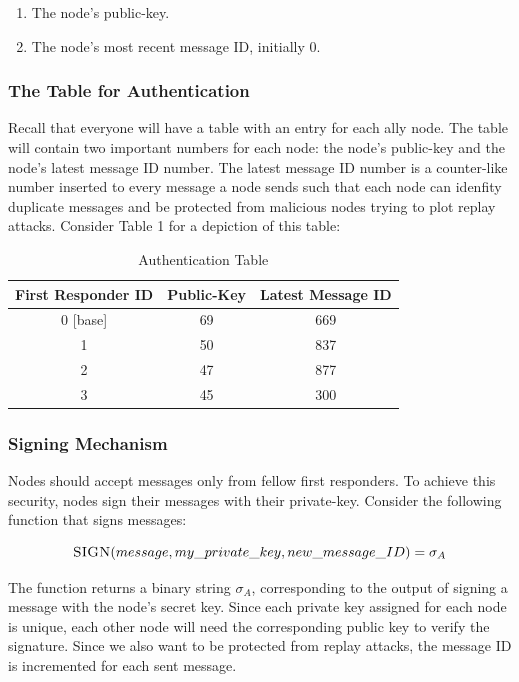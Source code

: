 \documentclass[letterpaper]{article}
\begin{document}
\begin{enumerate}
  \item The node's public-key. 
  \item The node's most recent message ID, initially 0.
\end{enumerate}

\subsubsection{The Table for Authentication}
Recall that everyone will have a table with an entry for each ally node. The table will contain two important numbers for each node: the node's public-key and the node's latest message ID number. The latest message ID number is a counter-like number inserted to every message a node sends such that each node can idenfity duplicate messages and be protected from malicious nodes trying to plot replay attacks. Consider Table 1 for a depiction of this table:

\begin{table}[ht]
\caption{Authentication Table} %
\centering %
\begin{tabular}{c c c } %
\hline
\hline %
First Responder ID & Public-Key & Latest Message ID  \\[0.5ex] %
\hline %
0 [base] & 69 & 669\\
1 & 50 & 837\\
2 & 47 & 877 \\
3 & 45 & 300\\ [1ex]
\hline
\end{tabular}
\label{table:nonlin}
\end{table}

\subsubsection{Signing Mechanism}

Nodes should accept messages only from fellow first responders. 
To achieve this security, nodes sign their messages with their private-key. 
Consider the following function that signs messages:

$$\textsc{SIGN}(message, my\_private\_key, new\_message\_ID) = \sigma_{A}$$

The function returns a binary string $\sigma_{A}$, corresponding to the output of signing a message with the node's secret key. Since each private key assigned for each node is unique, each other node will need the corresponding public key to verify the signature. Since we also want to be protected from replay attacks, the message ID is incremented for each sent message.
\end{document}
